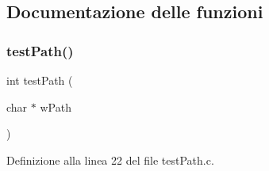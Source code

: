 \subsection{Documentazione delle funzioni}
\mbox{\label{a00056_ad53b7ea4b153982d90a2c13cc2712980}} 
\subsubsection{\texorpdfstring{testPath()}{testPath()}}
{\footnotesize\ttfamily int test\+Path (\begin{DoxyParamCaption}\item[{char $\ast$}]{w\+Path }\end{DoxyParamCaption})}



Definizione alla linea 22 del file test\+Path.\+c.


